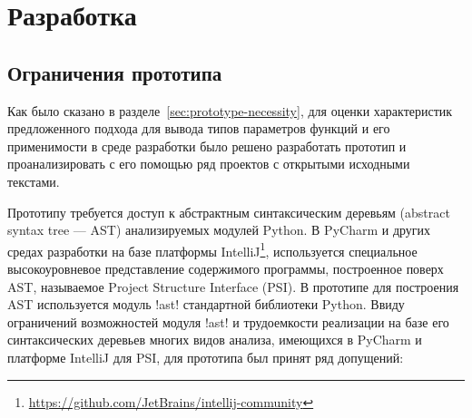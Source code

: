 \chapter{Разработка}
\label{sec:development}

\section{Ограничения прототипа}
\label{sec:prototype-limits}

Как было сказано в разделе~\ref{sec:prototype-necessity}, для оценки
характеристик предложенного подхода для вывода типов параметров функций и его
применимости в среде разработки было решено разработать прототип и
проанализировать с его помощью ряд проектов с открытыми исходными текстами.

Прототипу требуется доступ к абстрактным синтаксическим деревьям (abstract
syntax tree --- AST) анализируемых модулей Python. В PyCharm и других средах
разработки на базе платформы
IntelliJ\footnote{\url{https://github.com/JetBrains/intellij-community}},
используется специальное высокоуровневое представление содержимого программы,
построенное поверх AST, называемое Project Structure Interface (PSI). 
В прототипе для построения AST используется модуль !ast! стандартной библиотеки
Python. Ввиду ограничений возможностей модуля !ast! и трудоемкости реализации на
базе его синтаксических деревьев многих видов анализа, имеющихся в PyCharm и
платформе IntelliJ для PSI, для прототипа был принят ряд допущений:


